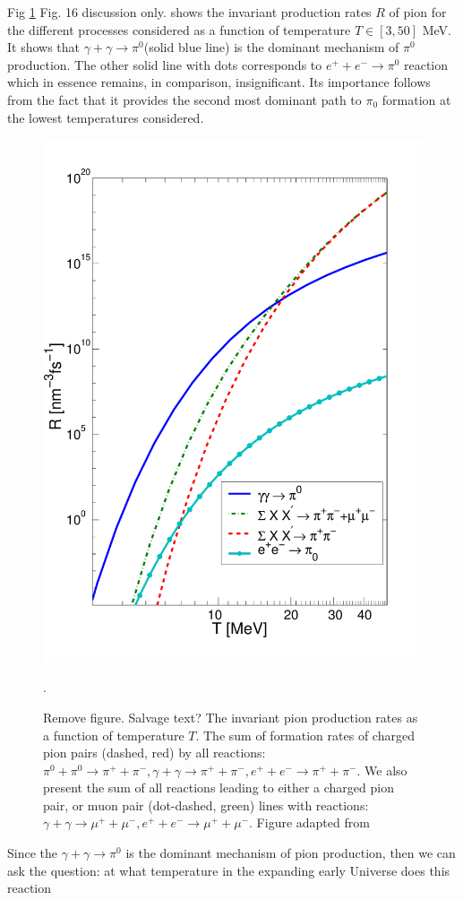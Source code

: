 \documentclass[universe,article,submit,moreauthors,pdftex,a4paper]{Definitions/mdpi}
\newcommand*{\xred}{\color{red}}
\begin{document}
Fig \ref{taumupi} {\xred Fig. 16 discussion only.} shows the invariant production rates $R$ of pion  for the different processes considered as a function of temperature $T\in [3,50]$ MeV. It shows that $\gamma+\gamma\to \pi^0$(solid blue line) is the dominant mechanism of $\pi^0$ production. The other solid line with dots corresponds to $e^++e^-\to \pi^0$ reaction which in essence remains, in comparison, insignificant. Its importance follows from the fact that it provides the second most dominant path to $\pi_0$ formation at the lowest temperatures considered.
\begin{figure}[ht]
\centering
\includegraphics[width=0.6\columnwidth]{./plots/pions1.pdf}
\caption{{\xred Remove figure. Salvage text?} The invariant pion production rates as a function of temperature $T$. The sum of formation rates of charged pion pairs (dashed, red) by all reactions: $\pi^{0}+\pi^{0}\to \pi^{+}+\pi^{-},  \gamma+\gamma \to \pi^{+}+\pi^{-}, e^++e^-\to \pi^{+}+\pi^{-}$.
We also present the sum of all reactions leading to either a charged pion pair, or muon pair (dot-dashed, green) lines with reactions:$\gamma+\gamma \to \mu^{+}+\mu^{-}, e^++e^-\to \mu^{+}+\mu^{-}$. Figure adapted from \cite{Kuznetsova:2008jt}}.
\label{taumupi}
\end{figure}
Since the  $\gamma+\gamma\to \pi^0$ is the dominant mechanism of pion production, then we can ask the question: at what temperature in the expanding early Universe does this reaction
\end{document}
